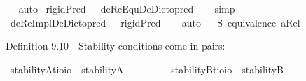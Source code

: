 \begin{isabellebody}
\isadelimproof
\ %
\endisadelimproof
%
\isatagproof
{}\isamarkupfalse%
\ auto%
\endisatagproof
{\isafoldproof}%
%
\isadelimproof
%
\endisadelimproof
\isanewline
{}\isamarkupfalse%
\ {\isachardoublequoteopen}{\isasymlfloor}rigidPred\ {\isacharparenleft}{\isasymtau}{\isacharcolon}{\isacharcolon}{\isasymup}{\isasymlangle}{\isasymzero}{\isasymrangle}{\isacharparenright}\ \isactrlbold {\isasymrightarrow}\ deReEquDeDicto{\isacharunderscore}pred\ {\isasymtau}{\isasymrfloor}{\isachardoublequoteclose}%
\isadelimproof
\ %
\endisadelimproof
%
\isatagproof
{}\isamarkupfalse%
\ simp%
\endisatagproof
{\isafoldproof}%
%
\isadelimproof
%
\endisadelimproof
\isanewline
{}\isamarkupfalse%
\ {\isachardoublequoteopen}{\isasymlfloor}deReImplDeDicto{\isacharunderscore}pred\ {\isacharparenleft}{\isasymtau}{\isacharcolon}{\isacharcolon}{\isasymup}{\isasymlangle}{\isasymzero}{\isasymrangle}{\isacharparenright}\ \isactrlbold {\isasymrightarrow}\ rigidPred\ {\isasymtau}{\isasymrfloor}{\isachardoublequoteclose}%
\isadelimproof
\ %
\endisadelimproof
%
\isatagproof
{}\isamarkupfalse%
\ auto%
\endisatagproof
{\isafoldproof}%
%
\isadelimproof
%
\endisadelimproof
%
\isamarkuptrue%
\isamarkupfalse%
\ \isanewline
\ S{}{\isacharcolon}\ {\isachardoublequoteopen}equivalence\ aRel{\isachardoublequoteclose}\ %
%
\begin{isamarkuptext}%
Definition 9.10 - Stability conditions come in pairs:%
\end{isamarkuptext}\isamarkuptrue%
\isamarkupfalse%
\ stabilityA{\isacharcolon}{\isacharcolon}{\isachardoublequoteopen}{\isacharparenleft}{\isacharprime}t{\isasymRightarrow}io{\isacharparenright}{\isasymRightarrow}io{\isachardoublequoteclose}\ \ {\isachardoublequoteopen}stabilityA\ {\isasymtau}\ {\isasymequiv}\ \isactrlbold {\isasymforall}{\isasymalpha}{\isachardot}\ {\isacharparenleft}{\isasymtau}\ {\isasymalpha}{\isacharparenright}\ \isactrlbold {\isasymrightarrow}\ \isactrlbold {\isasymbox}{\isacharparenleft}{\isasymtau}\ {\isasymalpha}{\isacharparenright}{\isachardoublequoteclose}\isanewline
{}\isamarkupfalse%
\ stabilityB{\isacharcolon}{\isacharcolon}{\isachardoublequoteopen}{\isacharparenleft}{\isacharprime}t{\isasymRightarrow}io{\isacharparenright}{\isasymRightarrow}io{\isachardoublequoteclose}\ \ {\isachardoublequoteopen}stabilityB\ {\isasymtau}\ {\isasymequiv}\ \isactrlbold {\isasymforall}{\isasymalpha}{\isachardot}\ \isactrlbold {\isasymdiamond}{\isacharparenleft}{\isasymtau}\ {\isasymalpha}{\isacharparenright}\ \isactrlbold {\isasymrightarrow}\ {\isacharparenleft}{\isasymtau}\ {\isasymalpha}{\isacharparenright}{\isachardoublequoteclose}%

\end{isabellebody}
